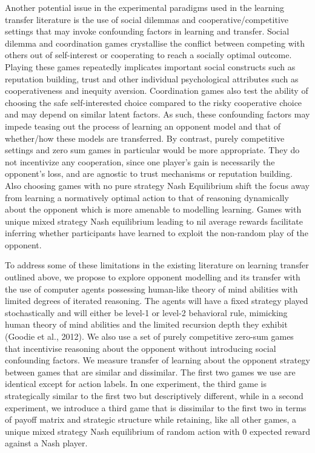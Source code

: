 \documentclass[,man,floatsintext]{apa6}
\begin{document}
Another potential issue in the experimental paradigms used in the learning transfer literature is the use of social dilemmas and cooperative/competitive settings that may invoke confounding factors in learning and transfer. Social dilemma and coordination games crystallise the conflict between competing with others out of self-interest or cooperating to reach a socially optimal outcome. Playing these games repeatedly implicates important social constructs such as reputation building, trust and other individual psychological attributes such as cooperativeness and inequity aversion. Coordination games also test the ability of choosing the safe self-interested choice compared to the risky cooperative choice and may depend on similar latent factors. As such, these confounding factors may impede teasing out the process of learning an opponent model and that of whether/how these models are transferred. By contrast, purely competitive settings and zero sum games in particular would be more appropriate. They do not incentivize any cooperation, since one player's gain is necessarily the opponent's loss, and are agnostic to trust mechanisms or reputation building. Also choosing games with no pure strategy Nash Equilibrium shift the focus away from learning a normatively optimal action to that of reasoning dynamically about the opponent which is more amenable to modelling learning. Games with unique mixed strategy Nash equilibrium leading to nil average rewards facilitate inferring whether participants have learned to exploit the non-random play of the opponent.

To address some of these limitations in the existing literature on learning transfer outlined above, we propose to explore opponent modelling and its transfer with the use of computer agents possessing human-like theory of mind abilities with limited degrees of iterated reasoning. The agents will have a fixed strategy played stochastically and will either be level-1 or level-2 behavioral rule, mimicking human theory of mind abilities and the limited recursion depth they exhibit (Goodie et al., 2012). We also use a set of purely competitive zero-sum games that incentivise reasoning about the opponent without introducing social confounding factors. We measure transfer of learning about the opponent strategy between games that are similar and dissimilar. The first two games we use are identical except for action labels. In one experiment, the third game is strategically similar to the first two but descriptively different, while in a second experiment, we introduce a third game that is dissimilar to the first two in terms of payoff matrix and strategic structure while retaining, like all other games, a unique mixed strategy Nash equilibrium of random action with 0 expected reward against a Nash player.
\end{document}
